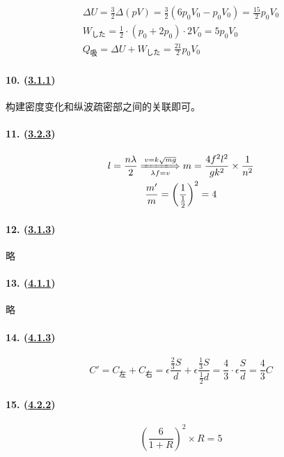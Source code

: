 \begin{gather*}
    \Delta U=\frac32\Delta(pV)=\frac32(6p_0V_0-p_0V_0)=\frac{15}{2}p_0V_0\\
    W_\textrm{した}=\frac12\cdot(p_0+2p_0)\cdot2V_0=5p_0V_0\\
    Q_\textrm{吸}=\Delta U+W_\textrm{した}=\frac{21}{2}p_0V_0
\end{gather*}

\paragraph{10. (\hyperref[subsec:1.3.1]{3.1.1})} 构建密度变化和纵波疏密部之间的关联即可。
\paragraph{11. (\hyperref[subsec:3.2.3]{3.2.3})}

\begin{gather*}
    l=\frac{n\lambda}{2}
    \xLongrightarrow[\lambda f=v]{v=k\sqrt{mg}}
    m=\frac{4f^2l^2}{gk^2}\times\frac{1}{n^2}\\
    \frac{m'}{m}=\left(\frac{1}{\frac12}\right)^2=4
\end{gather*}

\paragraph{12. (\hyperref[subsec:3.1.3]{3.1.3})} 略
\paragraph{13. (\hyperref[subsec:4.1.1]{4.1.1})} 略
\paragraph{14. (\hyperref[subsec:4.1.3]{4.1.3})}

\begin{equation*}
    C'=C_\textrm{左}+C_\textrm{右}
    =\epsilon\frac{\frac23S}{d}+\epsilon\frac{\frac13S}{\frac12d}
    =\frac43\cdot\epsilon\frac Sd
    =\frac43C
\end{equation*}

\paragraph{15. (\hyperref[subsec:4.2.2]{4.2.2})}

\begin{equation*}
    \left(\frac{6}{1+R}\right)^2\times R=5
\end{equation*}

